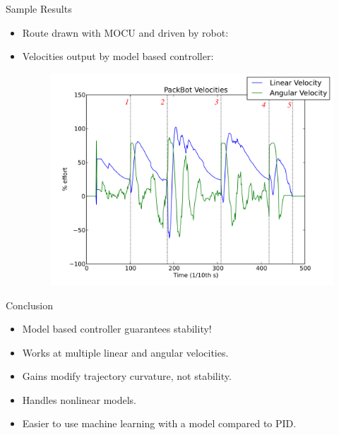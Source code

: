 \documentclass[hyperref={pdfpagelabels=false}]{beamer}
\begin{document}
\begin{frame}{Sample Results}
\begin{itemize}
\item Route drawn with MOCU and driven by robot:
\begin{figure}[ht!]
	\centering
    \quad
\end{figure}
\item Velocities output by model based controller:
\begin{figure}[ht!]
	\centering
	\includegraphics[width=.5\textwidth]{images/20100918_1717_velocities}
\end{figure}
\end{itemize}
\end{frame}

\begin{frame}{Conclusion}
\begin{itemize}
\item Model based controller guarantees stability!
\item Works at multiple linear and angular velocities.
\item Gains modify trajectory curvature, not stability.
\item Handles nonlinear models.
\item Easier to use machine learning with a model compared to PID.
\end{itemize}
\end{frame}
\end{document}
